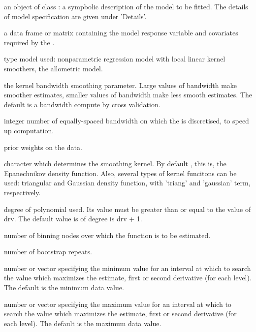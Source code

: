 \begin{Arguments}
\begin{ldescription}
\item[\code{formula}] an object of class : a sympbolic description of the model to be fitted. The details of model specification are given under 'Details'.
 
\item[\code{data}]  a data frame or matrix containing the model response variable and covariates required by the . 
  
\item[\code{model}] type model used:   nonparametric regression model with local linear kernel smoothers,  the  allometric model.
 
\item[\code{h}] the kernel bandwidth smoothing parameter. Large values of bandwidth make smoother estimates, smaller values of bandwidth make less smooth estimates. The default is a bandwidth compute by cross validation.

\item[\code{nh}] integer number of equally-spaced bandwidth on which the  is discretised, to speed up computation. 

\item[\code{weights}] prior weights on the data.

\item[\code{kernel}] character which determines the smoothing kernel. By default , this is, the Epanechnikov density function. Also, several types of kernel funcitons can be used:  triangular and Gaussian density function, with 'triang' and 'gaussian' term, respectively.

\item[\code{p}] degree of polynomial used.  Its value must be greater than or equal to the value of drv. The default value is of degree is drv + 1.

\item[\code{kbin}] number of binning nodes over which the function is to be estimated. 
 
\item[\code{nboot}] number of bootstrap repeats.

\item[\code{rankl}] number or vector specifying the minimum value for an interval at which to search the  value which maximizes the estimate, first or second derivative  (for each level). The default is the minimum data value.

\item[\code{ranku}] number or vector specifying the maximum value for an interval at which to search the  value which maximizes the estimate, first or second derivative  (for each level). The default is the maximum data value.
\end{ldescription}
\end{Arguments}
